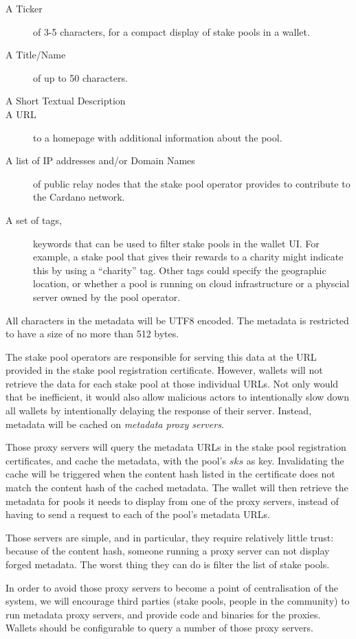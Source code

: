 \documentclass[11pt,a4paper,dvipsnames,twosided]{article}
\begin{document}
\begin{description}
\item[A Ticker]
  of 3-5 characters, for a compact display of stake pools in a
  wallet.
\item[A Title/Name]
  of up to 50 characters.
\item[A Short Textual Description]
\item[A URL]
  to a homepage with additional information about the pool.
\item[A list of IP addresses and/or Domain Names]
  of public relay nodes that the stake pool operator provides to contribute to
  the Cardano network.
\item[A set of tags,]
  keywords that can be used to filter stake pools in the wallet UI. For example,
  a stake pool that gives their rewards to a charity might indicate this by
  using a ``charity'' tag. Other tags could specify the geographic location, or
  whether a pool is running on cloud infrastructure or a physcial server owned
  by the pool operator.
\end{description}
All characters in the metadata will be UTF8 encoded. The metadata is restricted
to have a size of no more than 512 bytes.

The stake pool operators are responsible for serving this data at the URL
provided in the stake pool registration certificate. However, wallets will not
retrieve the data for each stake pool at those individual URLs. Not only would
that be inefficient, it would also allow malicious actors to intentionally slow
down all wallets by intentionally delaying the response of their server.
Instead, metadata will be cached on \emph{metadata proxy servers}.

Those proxy servers will query the metadata URLs in the stake pool registration
certificates, and cache the metadata, with the pool's \(sks\) as key.
Invalidating the cache will be triggered when the content hash listed in the
certificate does not match the content hash of the cached metadata. The wallet
will then retrieve the metadata for pools it needs to display from one of the
proxy servers, instead of having to send a request to each of the pool's
metadata URLs.

Those servers are simple, and in particular, they require relatively little
trust: because of the content hash, someone running a proxy server can not
display forged metadata. The worst thing they can do is filter the list of stake
pools.

In order to avoid those proxy servers to become a point of centralisation of the
system, we will encourage third parties (stake pools, people in the community)
to run metadata proxy servers, and provide code and binaries for the proxies.
Wallets should be configurable to query a number of those proxy servers.
\end{document}
